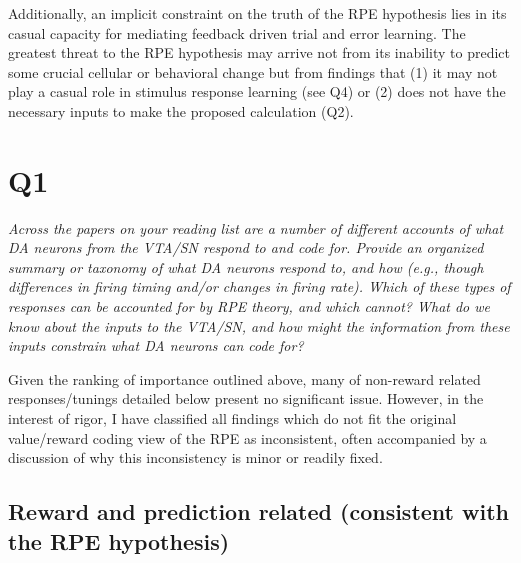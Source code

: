 \documentclass[doc]{apa}        %
\begin{document}
Additionally, an implicit constraint on the truth of the RPE hypothesis lies in its casual capacity for mediating feedback driven trial and error learning. The greatest threat to the RPE hypothesis may arrive not from its inability to predict some crucial cellular or behavioral change but from findings that (1) it may not play a casual role in stimulus response learning (see Q4) or (2) does not have the necessary inputs to make the proposed calculation (Q2).

\newpage
\section{Q1} %
\label{sec:q1}
\emph{Across the papers on your reading list are a number of different accounts of what DA neurons from the VTA/SN respond to and code for.   Provide an organized summary or taxonomy of what DA neurons respond to, and how (e.g., though differences in firing timing and/or changes in firing rate).  Which of these types of responses can be accounted for by RPE theory, and which cannot?  What do we know about the inputs to the VTA/SN, and how might the information from these inputs constrain what DA neurons can code for?}

Given the ranking of importance outlined above, many of non-reward related responses/tunings detailed below present no significant issue.  However, in the interest of rigor, I have classified all findings which do not fit the original value/reward coding view of the RPE as inconsistent, often accompanied by a discussion of why this inconsistency is minor or readily fixed.  


\subsection{Reward and prediction related (consistent with the RPE hypothesis)} %
\label{sub:consistent_with_the_rpe}
\end{document}

